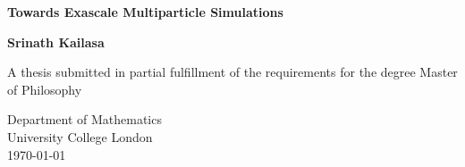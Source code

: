 \begin{titlepage}
    \begin{center}
        \vspace*{1cm}

        \Huge
        \textbf{Towards Exascale Multiparticle Simulations}

        \Large
        \vspace{0.5cm}

        \vfill

        \textbf{Srinath Kailasa}

        \vspace{5cm}

        A thesis submitted in partial fulfillment of the requirements for the
        degree Master of Philosophy 

        \vspace{0.8cm}


        \large
        Department of Mathematics\\
        University College London\\
        \monthyeardate\today

    \end{center}
 \end{titlepage}